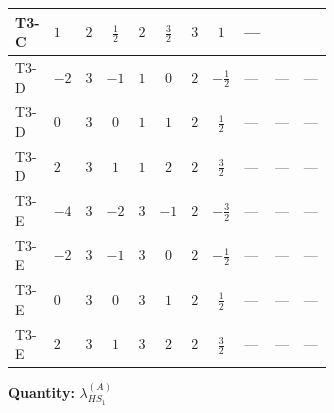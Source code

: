 \documentclass[8pt]{article}
\begin{document}
\begin{landscape}
\begin{longtable}{@{}llcccccc >{\raggedright\arraybackslash}p{0.21\linewidth} >{\raggedright\arraybackslash}p{0.21\linewidth} >{\raggedright\arraybackslash}p{0.21\linewidth}@{}}
\midrule
T3-C & $1$ & $2$ & $\frac{1}{2}$ & $2$ & $\frac{3}{2}$ & $3$ & $1$ & --- & \scriptsize\adjustbox{max width=\linewidth}{$\begin{gathered} -9 {g_2}^2 {\lambda_{HS_1}^{(A)}}\end{gathered}$} & \scriptsize\adjustbox{max width=\linewidth}{$\begin{gathered} +{\lambda_{12}^{(A)}} {\lambda_{HS_2}^{(A)}}\end{gathered}$} \\
\midrule
T3-D & $-2$ & $3$ & $-1$ & $1$ & $0$ & $2$ & $-\frac{1}{2}$ & --- & --- & --- \\
\midrule
T3-D & $0$ & $3$ & $0$ & $1$ & $1$ & $2$ & $\frac{1}{2}$ & --- & --- & --- \\
\midrule
T3-D & $2$ & $3$ & $1$ & $1$ & $2$ & $2$ & $\frac{3}{2}$ & --- & --- & --- \\
\midrule
T3-E & $-4$ & $3$ & $-2$ & $3$ & $-1$ & $2$ & $-\frac{3}{2}$ & --- & --- & --- \\
\midrule
T3-E & $-2$ & $3$ & $-1$ & $3$ & $0$ & $2$ & $-\frac{1}{2}$ & --- & --- & --- \\
\midrule
T3-E & $0$ & $3$ & $0$ & $3$ & $1$ & $2$ & $\frac{1}{2}$ & --- & --- & --- \\
\midrule
T3-E & $2$ & $3$ & $1$ & $3$ & $2$ & $2$ & $\frac{3}{2}$ & --- & --- & --- \\
\midrule
\bottomrule
\end{longtable}
\clearpage
\noindent\textbf{Quantity: }$\lambda_{HS_1}^{(A)}$\par\smallskip

\end{landscape}
\end{document}

